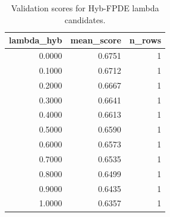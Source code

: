 \begin{table}[t]
\caption{Validation scores for Hyb-FPDE lambda candidates.}
\label{tab:lambda_distribution_computed}
\centering
\begin{tabular}{rrr}
\toprule
lambda\_hyb & mean\_score & n\_rows \\
\midrule
0.0000 & 0.6751 & 1 \\
0.1000 & 0.6712 & 1 \\
0.2000 & 0.6667 & 1 \\
0.3000 & 0.6641 & 1 \\
0.4000 & 0.6613 & 1 \\
0.5000 & 0.6590 & 1 \\
0.6000 & 0.6573 & 1 \\
0.7000 & 0.6535 & 1 \\
0.8000 & 0.6499 & 1 \\
0.9000 & 0.6435 & 1 \\
1.0000 & 0.6357 & 1 \\
\bottomrule
\end{tabular}

\end{table}
